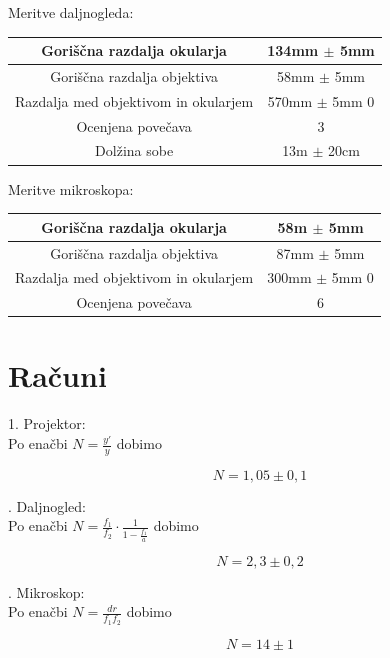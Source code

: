 \documentclass[a4paper]{report}
\begin{document}
  
\noindent  Meritve daljnogleda:

  \begin{center}
    \begin{tabular}{|c|c|} 
      \hline
      Goriščna razdalja okularja & 134mm $\pm$ 5mm \\
      \hline
      Goriščna razdalja objektiva & 58mm $\pm$ 5mm \\
      \hline
      Razdalja med objektivom in okularjem & 570mm $\pm$ 5mm 0\\
      \hline
      Ocenjena povečava & 3 \\
      \hline
      Dolžina sobe & 13m $\pm$ 20cm \\
      \hline
      

    \end{tabular}
  \end{center}
  
  
\noindent Meritve mikroskopa: 
 
  \begin{center}
    \begin{tabular}{|c|c|} 
      \hline
      Goriščna razdalja okularja & 58m $\pm$ 5mm \\
      \hline
      Goriščna razdalja objektiva & 87mm $\pm$ 5mm \\
      \hline
      Razdalja med objektivom in okularjem & 300mm $\pm$ 5mm 0\\
      \hline
      Ocenjena povečava & 6 \\
      \hline

    \end{tabular}
  \end{center}
  
  
  \chapter*{Računi}
  1. Projektor:\\
  Po enačbi $N=\frac{y'}{y}$ dobimo
  
  \[N=1,05 \pm 0,1\]
  
  . Daljnogled:\\
  Po enačbi $N=\frac{f_1}{f_2}\cdot \frac{1}{1-\frac{f_1}{a}}$ dobimo
  
  \[N=2,3 \pm 0,2\]
  
  . Mikroskop:\\
  Po enačbi $N=\frac{dr}{f_1f_2}$ dobimo
  
  \[N=14\pm1\]
\end{document}
